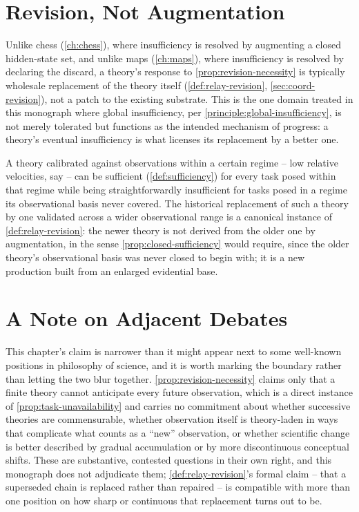 \section{Revision, Not Augmentation}

Unlike chess (\cref{ch:chess}), where insufficiency is resolved by
augmenting a closed hidden-state set, and unlike maps
(\cref{ch:maps}), where insufficiency is resolved by declaring the
discard, a theory's response to \cref{prop:revision-necessity} is
typically wholesale replacement of the theory itself
(\cref{def:relay-revision}, \cref{sec:coord-revision}), not a patch to
the existing substrate. This is the one domain treated in this monograph
where global insufficiency, per \cref{principle:global-insufficiency},
is not merely tolerated but functions as the intended mechanism of
progress: a theory's eventual insufficiency is what licenses its
replacement by a better one.

\begin{example}
A theory calibrated against observations within a certain regime --
low relative velocities, say -- can be sufficient
(\cref{def:sufficiency}) for every task posed within that regime while
being straightforwardly insufficient for tasks posed in a regime its
observational basis never covered. The historical replacement of such a
theory by one validated across a wider observational range is a
canonical instance of \cref{def:relay-revision}: the newer theory is not
derived from the older one by augmentation, in the sense
\cref{prop:closed-sufficiency} would require, since the older theory's
observational basis was never closed to begin with; it is a new
production built from an enlarged evidential base.
\end{example}

\section{A Note on Adjacent Debates}

This chapter's claim is narrower than it might appear next to some
well-known positions in philosophy of science, and it is worth marking
the boundary rather than letting the two blur together.
\cref{prop:revision-necessity} claims only that a finite theory cannot
anticipate every future observation, which is a direct instance of
\cref{prop:task-unavailability} and carries no commitment about whether
successive theories are commensurable, whether observation itself is
theory-laden in ways that complicate what counts as a ``new''
observation, or whether scientific change is better described by gradual
accumulation or by more discontinuous conceptual shifts. These are
substantive, contested questions in their own right, and this monograph
does not adjudicate them; \cref{def:relay-revision}'s formal claim --
that a superseded chain is replaced rather than repaired -- is compatible
with more than one position on how sharp or continuous that replacement
turns out to be.
